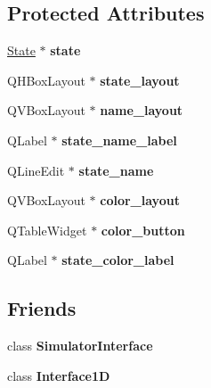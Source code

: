 \subsection*{Protected Attributes}
\begin{DoxyCompactItemize}
\item 
\mbox{\label{class_state_interface_a5629b695676a2cbc10e8be2c29a188af}} 
\mbox{\hyperlink{class_state}{State}} $\ast$ {\bfseries state}
\item 
\mbox{\label{class_state_interface_a79696d658e84991ddac8e1bea8ac9025}} 
Q\+H\+Box\+Layout $\ast$ {\bfseries state\+\_\+layout}
\item 
\mbox{\label{class_state_interface_a94caf6043658dbe71ea3c1df6b7da930}} 
Q\+V\+Box\+Layout $\ast$ {\bfseries name\+\_\+layout}
\item 
\mbox{\label{class_state_interface_a30016f369c5a1aaa47b3ee0fb75874cc}} 
Q\+Label $\ast$ {\bfseries state\+\_\+name\+\_\+label}
\item 
\mbox{\label{class_state_interface_abdbf14e6db68625a295112ada0121cb8}} 
Q\+Line\+Edit $\ast$ {\bfseries state\+\_\+name}
\item 
\mbox{\label{class_state_interface_a5a0ad3be37beb3b42babea7bcf1466bd}} 
Q\+V\+Box\+Layout $\ast$ {\bfseries color\+\_\+layout}
\item 
\mbox{\label{class_state_interface_a625022d6ab1c71928caa9a599c039547}} 
Q\+Table\+Widget $\ast$ {\bfseries color\+\_\+button}
\item 
\mbox{\label{class_state_interface_af2285532a84d853221b49488d21e27e6}} 
Q\+Label $\ast$ {\bfseries state\+\_\+color\+\_\+label}
\end{DoxyCompactItemize}
\subsection*{Friends}
\begin{DoxyCompactItemize}
\item 
\mbox{\label{class_state_interface_a936dbb0eeaa56c0fa3958ab784a4a413}} 
class {\bfseries Simulator\+Interface}
\item 
\mbox{\label{class_state_interface_a68f5e7fd83cf43d403714b0ccc0c0aec}} 
class {\bfseries Interface1D}
\end{DoxyCompactItemize}


